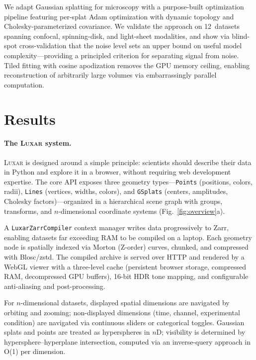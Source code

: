 \documentclass[10pt,twocolumn,letterpaper]{article}
\newcommand{\luxar}{\textsc{Luxar}\xspace}
\begin{document}
We adapt Gaussian splatting for microscopy with a purpose-built optimization pipeline featuring per-splat Adam optimization with dynamic topology and Cholesky-parameterized covariance.
We validate the approach on 12~datasets spanning confocal, spinning-disk, and light-sheet modalities, and show via blind-spot cross-validation\cite{batson2019noise2self} that the noise level sets an upper bound on useful model complexity---providing a principled criterion for separating signal from noise.
Tiled fitting with cosine apodization removes the GPU memory ceiling, enabling reconstruction of arbitrarily large volumes via embarrassingly parallel computation.


\section*{Results}

\paragraph{The \luxar system.}
\luxar is designed around a simple principle: scientists should describe their data in Python and explore it in a browser, without requiring web development expertise.
The core API exposes three geometry types---\texttt{Points} (positions, colors, radii), \texttt{Lines} (vertices, widths, colors), and \texttt{GSplats} (centers, amplitudes, Cholesky factors)---organized in a hierarchical scene graph with groups, transforms, and $n$-dimensional coordinate systems (Fig.~\ref{fig:overview}a).

A \texttt{LuxarZarrCompiler} context manager writes data progressively to Zarr, enabling datasets far exceeding RAM to be compiled on a laptop.
Each geometry node is spatially indexed via Morton (Z-order) curves, chunked, and compressed with Blosc/zstd.
The compiled archive is served over HTTP and rendered by a WebGL viewer with a three-level cache (persistent browser storage, compressed RAM, decompressed GPU buffers), 16-bit HDR tone mapping, and configurable anti-aliasing and post-processing.

For $n$-dimensional datasets, displayed spatial dimensions are navigated by orbiting and zooming; non-displayed dimensions (time, channel, experimental condition) are navigated via continuous sliders or categorical toggles.
Gaussian splats and points are treated as hyperspheres in $n$D; visibility is determined by hypersphere--hyperplane intersection, computed via an inverse-query approach in O(1) per dimension.
\end{document}
